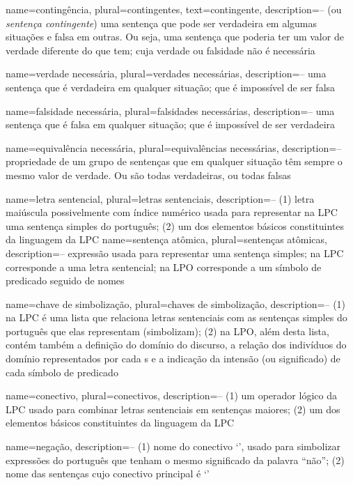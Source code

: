 {
name=contingência,
plural=contingentes,
text=contingente,
description={-- (ou \textit{sentença contingente}) uma sentença que pode ser verdadeira em algumas situações e falsa em outras. Ou seja, uma sentença que poderia ter um valor de verdade diferente do que tem; cuja verdade ou falsidade não é necessária}
}


{
name={verdade necessária},
plural={verdades necessárias},
description={-- uma sentença que é verdadeira em qualquer situação; que é impossível de ser falsa}
}

{
name={falsidade necessária},
plural={falsidades necessárias},
description={-- uma sentença que é falsa em qualquer situação; que é impossível de ser verdadeira}
}

{
name={equivalência necessária},
plural={equivalências necessárias},
description={-- propriedade de um grupo de sentenças que em qualquer situação têm sempre o mesmo valor de verdade. Ou são todas verdadeiras, ou todas falsas}
}

{
name=letra sentencial,
plural=letras sentenciais,
description={-- (1) letra maiúscula possivelmente com índice numérico usada para representar na LPC uma sentença simples do português; (2) um dos elementos básicos constituintes da linguagem da LPC}
}
{
name=sentença atômica,
plural=sentenças atômicas,
description={-- expressão usada para representar uma sentença simples; na LPC corresponde a uma letra sentencial; na LPO corresponde a um símbolo de predicado seguido de nomes}
}

{
name=chave de simbolização,
plural=chaves de simbolização,
description={-- (1) na LPC é uma lista que relaciona letras sentenciais com as sentenças simples do português que elas representam (simbolizam); (2) na LPO, além desta lista, contém também a definição do domínio do discurso, a relação dos indivíduos do domínio representados por cada s e a indicação da intensão (ou significado) de cada símbolo de predicado}
}

{
name=conectivo,
plural=conectivos,
description={-- (1) um operador lógico da LPC usado para combinar letras sentenciais em sentenças maiores; (2) um dos elementos básicos constituintes da linguagem da LPC}
}

{
name=negação,
description={-- (1) nome do conectivo `\enot', usado para simbolizar expressões do português que tenham o mesmo significado da palavra ``não''; (2) nome das sentenças cujo conectivo principal é `\enot'}
}

